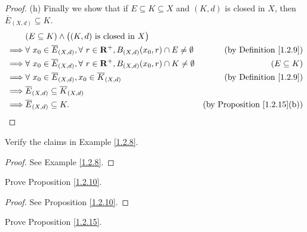 \begin{proof}{(h)}
    Finally we show that if \(E \subseteq K \subseteq X\) and \((K, d)\) is closed in \(X\), then \(\overline{E}_{(X, d)} \subseteq K\).
    \begin{align*}
                 & (E \subseteq K) \land \big((K, d) \text{ is closed in } X\big)                                                                                          \\
        \implies & \forall\ x_0 \in \overline{E}_{(X, d)}, \forall\ r \in \mathbf{R}^+, B_{(X, d)}(x_0, r) \cap E \neq \emptyset & \text{(by Definition \ref{1.2.9})}      \\
        \implies & \forall\ x_0 \in \overline{E}_{(X, d)}, \forall\ r \in \mathbf{R}^+, B_{(X, d)}(x_0, r) \cap K \neq \emptyset & (E \subseteq K)                         \\
        \implies & \forall\ x_0 \in \overline{E}_{(X, d)}, x_0 \in \overline{K}_{(X, d)}                                         & \text{(by Definition \ref{1.2.9})}      \\
        \implies & \overline{E}_{(X, d)} \subseteq \overline{K}_{(X, d)}                                                                                                   \\
        \implies & \overline{E}_{(X, d)} \subseteq K.                                                                            & \text{(by Proposition \ref{1.2.15}(b))}
    \end{align*}
\end{proof}

\exercisesection

\begin{exercise}\label{ex 1.2.1}
    Verify the claims in Example \ref{1.2.8}.
\end{exercise}

\begin{proof}
    See Example \ref{1.2.8}.
\end{proof}

\begin{exercise}\label{ex 1.2.2}
    Prove Proposition \ref{1.2.10}.
\end{exercise}

\begin{proof}
    See Proposition \ref{1.2.10}.
\end{proof}

\begin{exercise}\label{ex 1.2.3}
    Prove Proposition \ref{1.2.15}.
\end{exercise}

